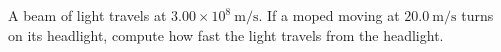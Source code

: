 A beam of light travels at $3.00 \times 10^8 \ \mathrm{m}/\mathrm{s}$. 
If a moped moving at $20.0 \ \mathrm{m}/\mathrm{s}$ turns on its headlight, 
compute how fast the light travels from the headlight.